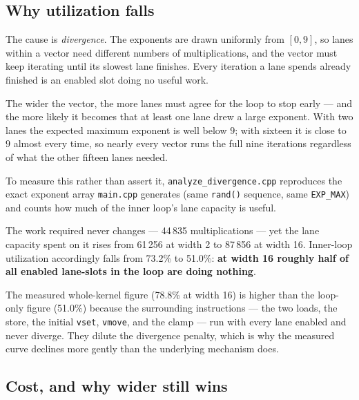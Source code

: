 \documentclass[11pt,a4paper]{article}
\begin{document}
\subsection{Why utilization falls}

The cause is \emph{divergence}. The exponents are drawn uniformly from
$[0, 9]$, so lanes within a vector need different numbers of multiplications,
and the vector must keep iterating until its slowest lane finishes. Every
iteration a lane spends already finished is an enabled slot doing no useful
work.

The wider the vector, the more lanes must agree for the loop to stop early ---
and the more likely it becomes that at least one lane drew a large exponent.
With two lanes the expected maximum exponent is well below $9$; with sixteen it
is close to $9$ almost every time, so nearly every vector runs the full nine
iterations regardless of what the other fifteen lanes needed.

To measure this rather than assert it, \texttt{analyze\_divergence.cpp}
reproduces the exact exponent array \texttt{main.cpp} generates (same
\texttt{rand()} sequence, same \texttt{EXP\_MAX}) and counts how much of the
inner loop's lane capacity is useful.

\begin{table}[H]
\centering
\progTwoDivergence
\caption{Inner-loop divergence at $N = 10000$. The work actually required is
         fixed at 44\,835 multiplications regardless of width; the lane
         capacity consumed to deliver it grows by 43\%.}
\label{tab:p2div}
\end{table}

The work required never changes --- 44\,835 multiplications --- yet the lane
capacity spent on it rises from 61\,256 at width 2 to 87\,856 at width 16.
Inner-loop utilization accordingly falls from 73.2\% to 51.0\%: \textbf{at
width 16 roughly half of all enabled lane-slots in the loop are doing nothing}.

The measured whole-kernel figure (78.8\% at width 16) is higher than the
loop-only figure (51.0\%) because the surrounding instructions --- the two
loads, the store, the initial \texttt{vset}, \texttt{vmove}, and the clamp ---
run with every lane enabled and never diverge. They dilute the divergence
penalty, which is why the measured curve declines more gently than the
underlying mechanism does.

\subsection{Cost, and why wider still wins}
\end{document}
